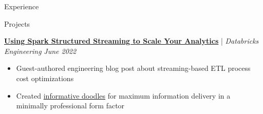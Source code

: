 \documentclass{content/resume/resume}
\begin{document}
\begin{rSection}{Experience}
  
\end{rSection}

\begin{rSection}{Projects}

  
  \href{https://databricks.com/blog/2022/07/14/using-spark-structured-streaming-to-scale-your-analytics.html}{{\bf Using Spark Structured Streaming to Scale Your Analytics}} | {\em Databricks Engineering} \hfill {\em June 2022}
  \vspace{-6pt}
  \begin{itemize}[nosep]
    \item Guest-authored engineering blog post about streaming-based ETL process cost optimizations
    \item Created \href{https://www.databricks.com/blog/2022/07/14/using-spark-structured-streaming-to-scale-your-analytics.html#:~:text=With\%20your\%20new\%20aggregated\%20data\%2C\%20you\%20can\%20throw\%20together\%20a\%20nice\%20visualization\%20to\%20do...\%20business\%20things.}{informative doodles} for maximum information delivery in a minimally professional form factor
  \end{itemize}


\end{rSection}
\end{document}
